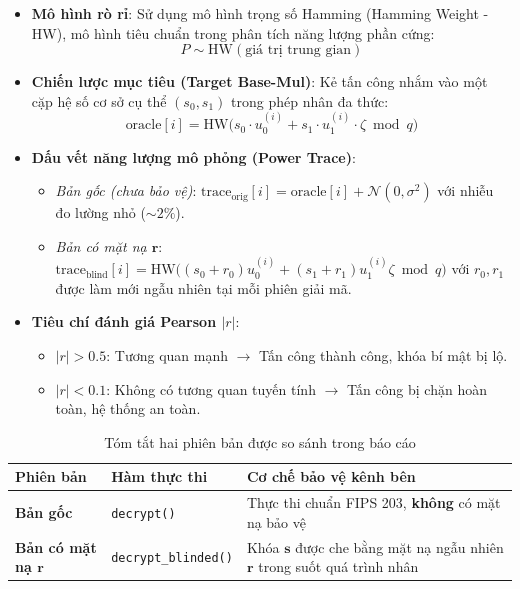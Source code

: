 \documentclass[../LuanVan.tex]{subfiles}
\begin{document}
\begin{itemize}[leftmargin=2cm]
    \item \textbf{Mô hình rò rỉ}: Sử dụng mô hình trọng số Hamming (Hamming Weight - HW), mô hình tiêu chuẩn trong phân tích năng lượng phần cứng:
    \begin{equation}
        P \sim \text{HW}(\text{giá trị trung gian})
    \end{equation}
    \item \textbf{Chiến lược mục tiêu (Target Base-Mul)}: Kẻ tấn công nhắm vào một cặp hệ số cơ sở cụ thể $(s_0, s_1)$ trong phép nhân đa thức:
    \begin{equation}
        \text{oracle}[i] = \text{HW}\bigl(s_0 \cdot u_0^{(i)} + s_1 \cdot u_1^{(i)} \cdot \zeta \bmod q\bigr)
    \end{equation}
    \item \textbf{Dấu vết năng lượng mô phỏng (Power Trace)}:
    \begin{itemize}
        \item \textit{Bản gốc (chưa bảo vệ)}: $\text{trace}_{\text{orig}}[i] = \text{oracle}[i] + \mathcal{N}(0, \sigma^2)$ với nhiễu đo lường nhỏ ($\sim 2\%$).
        \item \textit{Bản có mặt nạ $\mathbf{r}$}: $\text{trace}_{\text{blind}}[i] = \text{HW}\bigl((s_0 + r_0) u_0^{(i)} + (s_1 + r_1) u_1^{(i)} \zeta \bmod q\bigr)$ với $r_0, r_1$ được làm mới ngẫu nhiên tại mỗi phiên giải mã.
    \end{itemize}
    \item \textbf{Tiêu chí đánh giá Pearson $|r|$}:
    \begin{itemize}
        \item $|r| > 0.5$: Tương quan mạnh $\rightarrow$ Tấn công thành công, khóa bí mật bị lộ.
        \item $|r| < 0.1$: Không có tương quan tuyến tính $\rightarrow$ Tấn công bị chặn hoàn toàn, hệ thống an toàn.
    \end{itemize}
\end{itemize}

\begin{table}[H]
\centering
\caption{Tóm tắt hai phiên bản được so sánh trong báo cáo}
\label{tab:two_versions}
\begin{tabularx}{\textwidth}{l l X}
\toprule
\textbf{Phiên bản} & \textbf{Hàm thực thi} & \textbf{Cơ chế bảo vệ kênh bên} \\
\midrule
\textbf{Bản gốc} & \texttt{decrypt()} & Thực thi chuẩn FIPS 203, \textbf{không} có mặt nạ bảo vệ \\
\textbf{Bản có mặt nạ $\mathbf{r}$} & \texttt{decrypt\_blinded()} & Khóa $\mathbf{s}$ được che bằng mặt nạ ngẫu nhiên $\mathbf{r}$ trong suốt quá trình nhân \\
\bottomrule
\end{tabularx}
\end{table}
\end{document}
